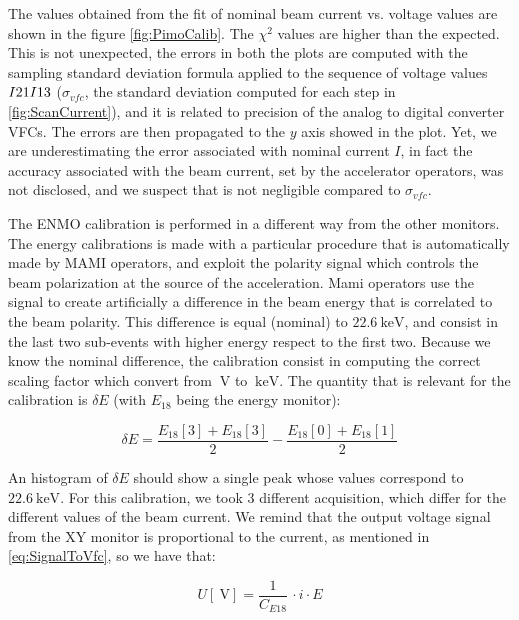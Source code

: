 The values obtained from the fit of nominal beam current vs. voltage values are shown in the figure \ref{fig:PimoCalib}. The $\chi^{2}$ values are higher than the expected. This is not unexpected, the errors in both the plots are computed with the sampling standard deviation formula applied to the sequence of voltage values $I21\/ I13$ ($\sigma_{vfc}$, the standard deviation computed for each step in \ref{fig:ScanCurrent}), and it is related to precision of the analog to digital converter VFCs. The errors are then propagated to the $y$ axis showed in the plot. \smallskip
Yet, we are underestimating the error associated with nominal current $I$, in fact the accuracy associated with the beam current, set by the accelerator operators, was not disclosed, and we suspect that is not negligible compared to $\sigma_{vfc}$. \bigskip  

The ENMO calibration is performed in a different way from the other monitors. The energy calibrations is made with a particular procedure that is automatically made by MAMI operators, and exploit the polarity signal which controls the beam polarization at the source of the acceleration. Mami operators use the signal to create artificially a difference in the beam energy that is correlated to the beam polarity. This difference is equal (nominal) to $\SI{22.6}{\kilo \electronvolt}$, and consist in the last two sub-events with higher energy respect to the first two. Because we know the nominal difference, the calibration consist in computing the correct scaling factor which convert from $\SI{}{\volt}$ to $\SI{}{\kilo \electronvolt}$. The quantity that is relevant for the calibration is $\delta E$ (with $E_{18}$ being the energy monitor):

\begin{equation*}
\delta E = \frac{E_{18}[3] + E_{18}[3]}{2} - \frac{E_{18}[0] + E_{18}[1]}{2} 
\end{equation*}

An histogram of $\delta E$ should show a single peak whose values correspond to $\SI{22.6}{\kilo \electronvolt}$.
For this calibration, we took 3 different acquisition, which differ for the different values of the beam current. We remind that the output voltage signal from the XY monitor is proportional to the current, as mentioned in \ref{eq:SignalToVfc}, so we have that:

\begin{equation}
U[\SI{}{\volt}] = \frac{1}{C_{E18}} \, \cdot  i \cdot E
\end{equation}

